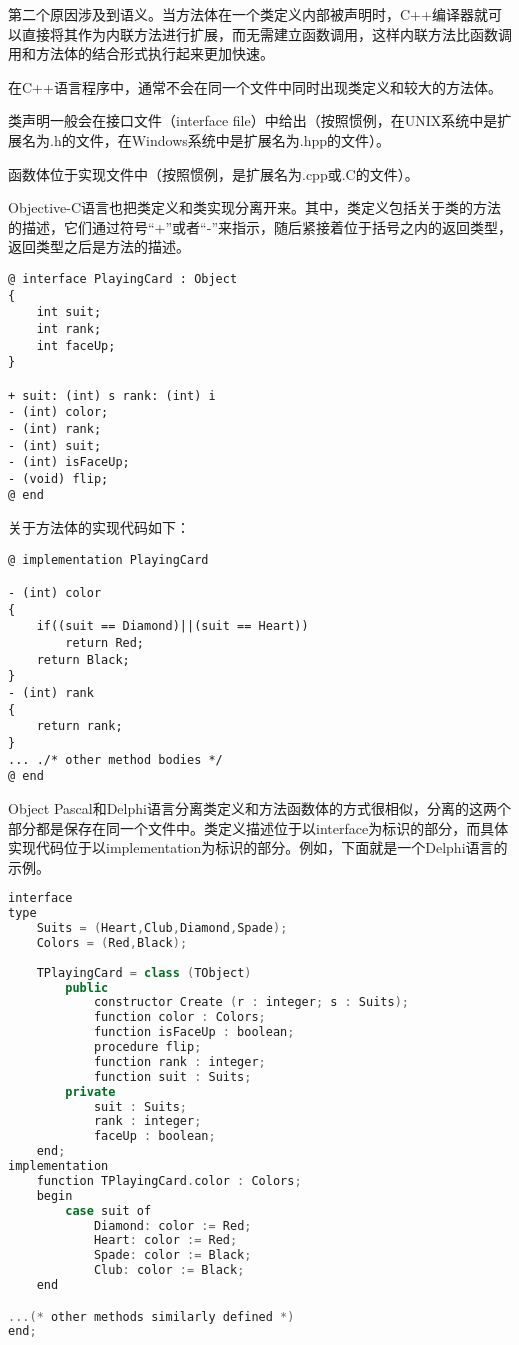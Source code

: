 第二个原因涉及到语义。当方法体在一个类定义内部被声明时，C++编译器就可以直接将其作为内联方法进行扩展，而无需建立函数调用，这样内联方法比函数调用和方法体的结合形式执行起来更加快速。


在C++语言程序中，通常不会在同一个文件中同时出现类定义和较大的方法体。

\begin{compactitem}
\item 类声明一般会在接口文件（interface file）中给出（按照惯例，在UNIX系统中是扩展名为.h的文件，在Windows系统中是扩展名为.hpp的文件）。
\item 函数体位于实现文件中（按照惯例，是扩展名为.cpp或.C的文件）。
\end{compactitem}

Objective-C语言也把类定义和类实现分离开来。其中，类定义包括关于类的方法的描述，它们通过符号“+”或者“-”来指示，随后紧接着位于括号之内的返回类型，返回类型之后是方法的描述。

\begin{lstlisting}[language={[Objective]C}]
@ interface PlayingCard : Object
{
	int suit;
	int rank;
	int faceUp;
}
	
+ suit: (int) s rank: (int) i
- (int) color;
- (int) rank;
- (int) suit;
- (int) isFaceUp;
- (void) flip;
@ end
\end{lstlisting}


关于方法体的实现代码如下：



\begin{lstlisting}[language={[Objective]C}]
@ implementation PlayingCard
	
- (int) color
{
	if((suit == Diamond)||(suit == Heart))
		return Red;
	return Black;
}
- (int) rank
{
	return rank;
}
... ./* other method bodies */
@ end
\end{lstlisting}



Object Pascal和Delphi语言分离类定义和方法函数体的方式很相似，分离的这两个部分都是保存在同一个文件中。类定义描述位于以interface为标识的部分，而具体实现代码位于以implementation为标识的部分。例如，下面就是一个Delphi语言的示例。


\begin{lstlisting}[language=C++]
interface
type
	Suits = (Heart,Club,Diamond,Spade);
	Colors = (Red,Black);
	
	TPlayingCard = class (TObject)
		public
			constructor Create (r : integer; s : Suits);
			function color : Colors;
			function isFaceUp : boolean;
			procedure flip;
			function rank : integer;
			function suit : Suits;
		private
			suit : Suits;
			rank : integer;
			faceUp : boolean;
	end;	
implementation
	function TPlayingCard.color : Colors;
	begin
		case suit of
			Diamond: color := Red;	
			Heart: color := Red;
			Spade: color := Black;
			Club: color := Black;
	end

...(* other methods similarly defined *)
end;
\end{lstlisting}



